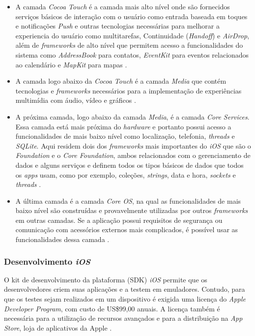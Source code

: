 \begin{itemize}
	\item A camada \textit{Cocoa Touch} é a camada mais alto nível onde são fornecidos serviços básicos de interação 
    com o usuário como entrada baseada em toques e notificações \textit{Push} e outras tecnologias necessárias para
     melhorar a experiencia do usuário como multitarefas, Continuidade (\textit{Handoff}) e \textit{AirDrop}, além de \textit{frameworks} 
     de alto nível que permitem acesso a funcionalidades do sistema como \textit{AddressBook} para contatos, \textit{EventKit} 
     para eventos relacionados ao calendário e \textit{MapKit} para mapas \cite{apple_inc_tech_2014}.
	\item A camada logo abaixo da \textit{Cocoa Touch} é a camada \textit{Media} que contém tecnologias e \textit{frameworks} necessários 
    para a implementação de experiências multimídia com áudio, vídeo e gráficos \cite{apple_inc_tech_2014}.
	\item A próxima camada, logo abaixo da camada \textit{Media}, é a camada \textit{Core Services}. Essa camada está mais próxima 
    do \textit{hardware} e portanto possui acesso a funcionalidades de mais baixo nível como localização, telefonia, \textit{threads} 
    e \textit{SQLite}. Aqui residem dois dos \textit{frameworks} mais importantes do \textit{iOS} que são o \textit{Foundation} e o \textit{Core Foundation}, 
    ambos relacionados com o gerenciamento de dados e alguns serviços e definem todos os tipos básicos de dados que 
    todos os \textit{apps} usam, como por exemplo, coleções, \textit{strings}, data e hora, \textit{sockets} e \textit{threads} \cite{apple_inc_tech_2014}.
	\item A última camada é a camada \textit{Core OS}, na qual as funcionalidades de mais baixo nível são construídas e 
    provavelmente utilizadas por outros \textit{frameworks} em outras camadas. Se a aplicação possui requisitos de segurança 
    ou comunicação com acessórios externos mais complicados, é possível usar as funcionalidades dessa camada \cite{apple_inc_tech_2014}.
\end{itemize}

\subsubsection{Desenvolvimento \textit{iOS}} \label{subsubsection-dev-ios}

O kit de desenvolvimento da plataforma (SDK) \textit{iOS} permite que os desenvolvedores criem suas aplicações e a testem em emuladores. 
Contudo, para que os testes sejam realizados em um dispositivo é exigida uma licença do \textit{Apple Developer Program}, 
com custo de US\$99,00 anuais. A licença também é necessária para a utilização de recursos avançados e para a distribuição 
na \textit{App Store}, loja de aplicativos da Apple \cite{apple_inc_program_2016}.   

